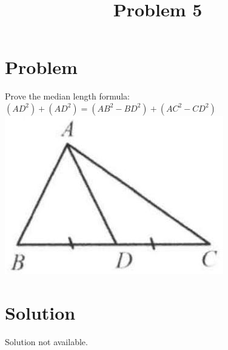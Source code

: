 \documentclass{article}
\title{Problem 5}
\date{}
\begin{document}
\maketitle

\section*{Problem}
Prove the median length formula:\\
\(\left(A D^{2}\right)+\left(A D^{2}\right)=\left(A B^{2}-B D^{2}\right)+\left(A C^{2}-C D^{2}\right)\)\\
\centering
\includegraphics[width=\textwidth]{images/028.jpg}

\section*{Solution}
Solution not available.
\end{document}
